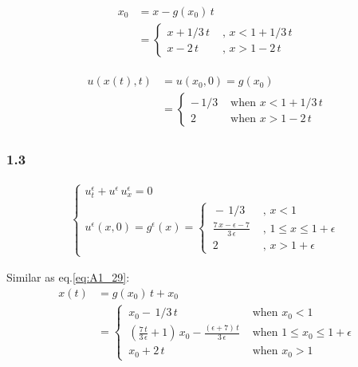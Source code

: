 \documentclass[../main.tex]{subfiles}
\begin{document}
\begin{align}
    x_0 &= x - g(x_0) \, t \nonumber \\
        &= \begin{cases} \label{eq:A1_31}
              x + 1/3 \, t & \text{ , } x < 1 + 1/3 \, t \\
              x - 2 \, t & \text{ , } x > 1 - 2 \, t
          \end{cases}
\end{align}

\begin{align} \label{eq:A1_32}
    \begin{split}
        u(x(t),t) &= u(x_0,0) = g(x_0) \\
        &= \begin{cases}
               - \, 1/3 & \text{ when } x < 1 + 1/3 \, t \\
               2 & \text{ when } x > 1 - 2 \, t
           \end{cases}
    \end{split}
\end{align}

\subsubsection{1.3}

\begin{align} \label{eq:A1_33}
    \begin{cases} \label{eq:A1_26}
    u_t^{\epsilon} + u^{\epsilon} \, u_x^{\epsilon} = 0 \\
    u^{\epsilon}(x,0) = g^{\epsilon}(x) = \begin{cases}
                                   \, - \, 1/3 & \text{ , } x < 1 \\
                                   \, \frac{7 \, x - \epsilon - 7}{3 \, \epsilon}& \text{ , } 1 \leqslant x \leqslant 1 + \epsilon \\
                                   \, 2 & \text{ , } x > 1 + \epsilon
                                          \end{cases}
    \end{cases}
\end{align}

Similar as eq.\ref{eq:A1_29}:
\begin{align}
    x(t) &= g(x_0) \, t + x_0 \nonumber \\
    &= \begin{cases} \label{eq:A1_34}
           \, x_0 - \, 1/3 \,t & \text{ when } x_0 < 1 \\
           \, (\frac{7 \, t}{3 \, \epsilon} + 1) \, x_0 - \frac{(\epsilon + 7) \, t}{3 \, \epsilon}  & \text{ when } 1 \leqslant x_0 \leqslant 1 + \epsilon \\
           \, x_0 + 2 \, t & \text{ when } x_0 > 1
       \end{cases}
\end{align}
\end{document}
